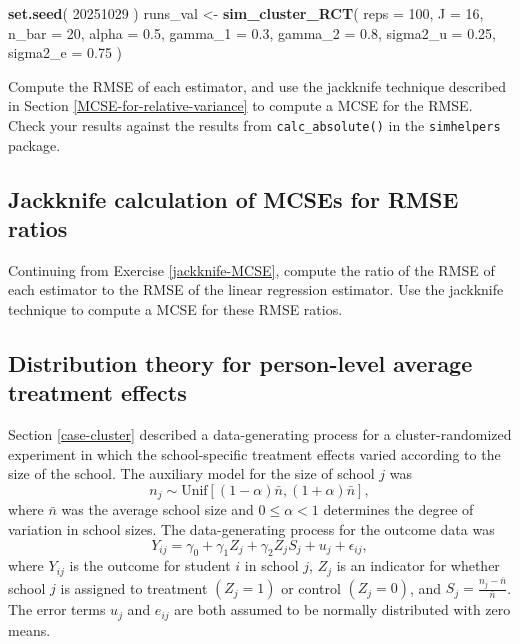 \documentclass[
]{book}
\newenvironment{Shaded}{\begin{snugshade}}{\end{snugshade}}
\newcommand{\AttributeTok}[1]{\textcolor[rgb]{0.13,0.29,0.53}{#1}}
\newcommand{\DecValTok}[1]{\textcolor[rgb]{0.00,0.00,0.81}{#1}}
\newcommand{\FloatTok}[1]{\textcolor[rgb]{0.00,0.00,0.81}{#1}}
\newcommand{\FunctionTok}[1]{\textcolor[rgb]{0.13,0.29,0.53}{\textbf{#1}}}
\newcommand{\NormalTok}[1]{#1}
\newcommand{\OtherTok}[1]{\textcolor[rgb]{0.56,0.35,0.01}{#1}}
\begin{document}
\begin{Shaded}
\begin{Highlighting}[]
\FunctionTok{set.seed}\NormalTok{( }\DecValTok{20251029}\NormalTok{ )}
\NormalTok{runs\_val }\OtherTok{\textless{}{-}} \FunctionTok{sim\_cluster\_RCT}\NormalTok{( }
  \AttributeTok{reps =} \DecValTok{100}\NormalTok{, }
  \AttributeTok{J =} \DecValTok{16}\NormalTok{, }\AttributeTok{n\_bar =} \DecValTok{20}\NormalTok{, }\AttributeTok{alpha =} \FloatTok{0.5}\NormalTok{,}
  \AttributeTok{gamma\_1 =} \FloatTok{0.3}\NormalTok{, }\AttributeTok{gamma\_2 =} \FloatTok{0.8}\NormalTok{,}
  \AttributeTok{sigma2\_u =} \FloatTok{0.25}\NormalTok{, }\AttributeTok{sigma2\_e =} \FloatTok{0.75}
\NormalTok{)}
\end{Highlighting}
\end{Shaded}

Compute the RMSE of each estimator, and use the jackknife technique described in Section \ref{MCSE-for-relative-variance} to compute a MCSE for the RMSE.
Check your results against the results from \texttt{calc\_absolute()} in the \texttt{simhelpers} package.

\subsection{Jackknife calculation of MCSEs for RMSE ratios}\label{jackknife-MCSE-ratio}

Continuing from Exercise \ref{jackknife-MCSE}, compute the ratio of the RMSE of each estimator to the RMSE of the linear regression estimator. Use the jackknife technique to compute a MCSE for these RMSE ratios.

\subsection{Distribution theory for person-level average treatment effects}\label{cluster-RCT-SPATE}

Section \ref{case-cluster} described a data-generating process for a cluster-randomized experiment in which the school-specific treatment effects varied according to the size of the school.
The auxiliary model for the size of school \(j\) was
\[ 
n_j \sim \text{Unif}\left[ (1-\alpha)\bar{n}, (1+\alpha)\bar{n} \right],
\]
where \(\bar{n}\) was the average school size and \(0 \leq \alpha < 1\) determines the degree of variation in school sizes.
The data-generating process for the outcome data was
\[
Y_{ij} = \gamma_{0} + \gamma_{1} Z_j + \gamma_{2} Z_j S_j  + u_j + \epsilon_{ij},
\]
where \(Y_{ij}\) is the outcome for student \(i\) in school \(j\), \(Z_j\) is an indicator for whether school \(j\) is assigned to treatment \((Z_j = 1)\) or control \((Z_j = 0)\), and \(S_j = \frac{n_j - \bar{n}}{\bar{n}}\).
The error terms \(u_j\) and \(e_{ij}\) are both assumed to be normally distributed with zero means.
\end{document}
